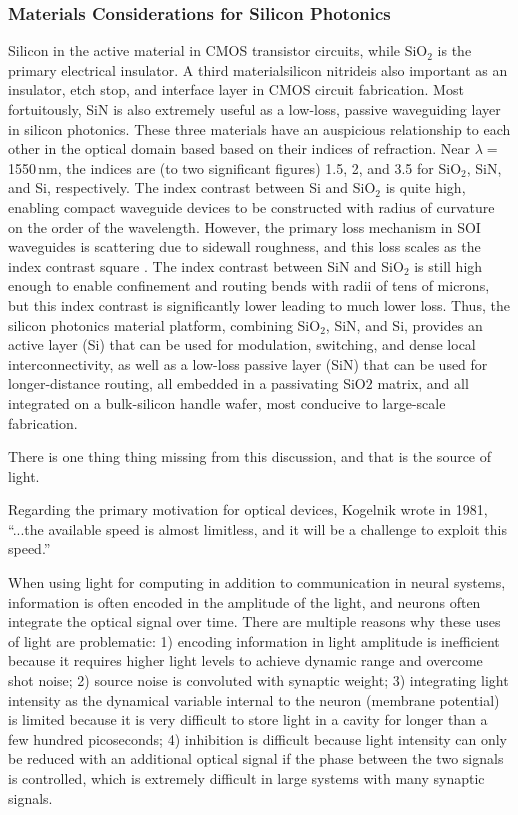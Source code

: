 \subsubsection{Materials Considerations for Silicon Photonics}
Silicon in the active material in CMOS transistor circuits, while SiO$_2$ is the primary electrical insulator. A third material\textemdash silicon nitride\textemdash is also important as an insulator, etch stop, and interface layer in CMOS circuit fabrication. Most fortuitously, SiN is also extremely useful as a low-loss, passive waveguiding layer in silicon photonics. These three materials have an auspicious relationship to each other in the optical domain based based on their indices of refraction. Near $\lambda =$\,1550\,nm, the indices are (to two significant figures) 1.5, 2, and 3.5 for SiO$_2$, SiN, and Si, respectively. The index contrast between Si and SiO$_2$ is quite high, enabling compact waveguide devices to be constructed with radius of curvature on the order of the wavelength. However, the primary loss mechanism in SOI waveguides is scattering due to sidewall roughness, and this loss scales as the index contrast square \cite{vlmc2004}. The index contrast between SiN and SiO$_2$ is still high enough to enable confinement and routing bends with radii of tens of microns, but this index contrast is significantly lower leading to much lower loss. Thus, the silicon photonics material platform, combining SiO$_2$, SiN, and Si, provides an active layer (Si) that can be used for modulation, switching, and dense local interconnectivity, as well as a low-loss passive layer (SiN) that can be used for longer-distance routing, all embedded in a passivating SiO$2$ matrix, and all integrated on a bulk-silicon handle wafer, most conducive to large-scale fabrication.

There is one thing thing missing from this discussion, and that is the source of light.


\vspace{3em}
Regarding the primary motivation for optical devices, Kogelnik wrote in 1981, ``...the available speed is almost limitless, and it will be a challenge to exploit this speed.'' \cite{ko1981}





\vspace{3em}
When using light for computing in addition to communication in neural systems, information is often encoded in the amplitude of the light, and neurons often integrate the optical signal over time. There are multiple reasons why these uses of light are problematic: 1) encoding information in light amplitude is inefficient because it requires higher light levels to achieve dynamic range and overcome shot noise; 2) source noise is convoluted with synaptic weight; 3) integrating light intensity as the dynamical variable internal to the neuron (membrane potential) is limited because it is very difficult to store light in a cavity for longer than a few hundred picoseconds; 4) inhibition is difficult because light intensity can only be reduced with an additional optical signal if the phase between the two signals is controlled, which is extremely difficult in large systems with many synaptic signals.

